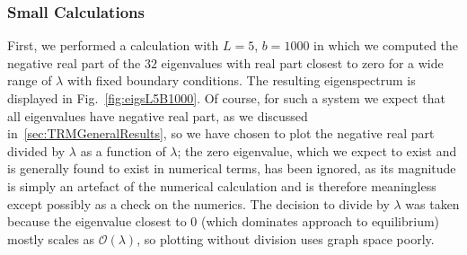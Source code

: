  \subsubsection{Small Calculations}
 First, we performed a calculation with $L=5$, $b=1000$ in which we computed the
 negative real part of the $32$ eigenvalues with real part closest to zero for a wide range of $\lambda$ with fixed
 boundary conditions. The resulting eigenspectrum is displayed in
 Fig.~\ref{fig:eigsL5B1000}.
Of course, for such a system we expect that all eigenvalues have negative real part,
as we discussed in~\ref{sec:TRMGeneralResults}, so we have chosen to plot the
negative real part divided by $\lambda$ as a function of $\lambda$; the zero eigenvalue,
which we expect to exist and is generally found to exist in numerical terms, has been ignored, as its magnitude is simply an artefact of the numerical calculation and
is therefore meaningless except possibly as a check on the numerics. The decision 
to divide by $\lambda$ was taken because the eigenvalue closest to $0$ (which dominates
approach to equilibrium) mostly scales as $\mathcal{O}(\lambda)$, so plotting without division
uses graph space poorly.

